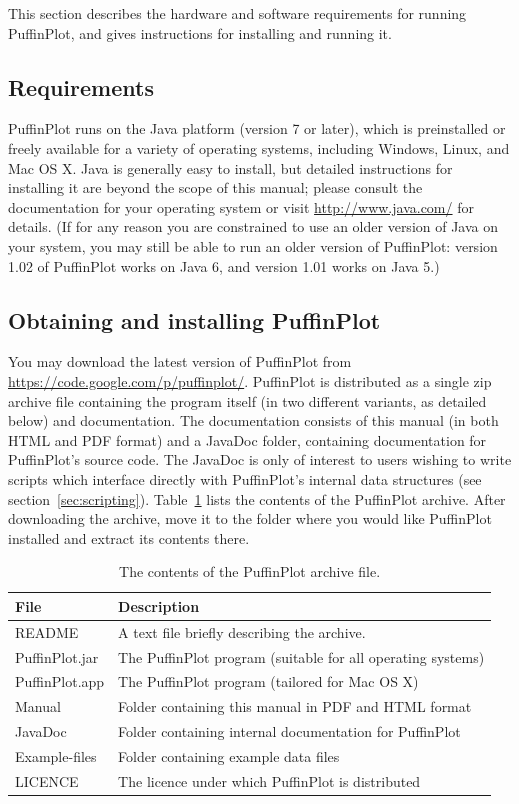 \documentclass[a4paper,british]{article}
\begin{document}
This section describes the hardware and software requirements for
running PuffinPlot, and gives instructions for installing and running
it.

\subsection{Requirements}

PuffinPlot runs on the Java platform (version 7 or later), which is
preinstalled or freely available for a variety of operating systems,
including Windows, Linux, and Mac OS X. Java is generally easy to install,
but detailed instructions for installing it are beyond the scope of this
manual; please consult the documentation for your operating system or visit
\url{http://www.java.com/} for details. (If for any reason you are
constrained to use an older version of Java on your system, you may still
be able to run an older version of PuffinPlot: version 1.02 of PuffinPlot
works on Java 6, and version 1.01 works on Java 5.)

\subsection{Obtaining and installing PuffinPlot}

You may download the latest version of PuffinPlot from
\url{https://code.google.com/p/puffinplot/}. PuffinPlot is distributed as a
single zip archive file containing the program itself (in two different
variants, as detailed below) and documentation. The documentation consists of
this manual (in both HTML and PDF format) and a JavaDoc folder, containing
documentation for PuffinPlot's source code. The JavaDoc is only of interest
to users wishing to write scripts which interface directly with PuffinPlot's
internal data structures (see section~\ref{sec:scripting}).
Table~\ref{tbl:archive-contents} lists the contents of the PuffinPlot
archive. After downloading the archive, move it to the folder where you
would like PuffinPlot installed and extract its contents there.

\begin{table}[bp]
  \caption{\label{tbl:archive-contents} The contents of the PuffinPlot archive file.}
\begin{tabular}{ll} \toprule
File           & Description \\ \midrule
README         & A text file briefly describing the archive. \\
PuffinPlot.jar & The PuffinPlot program (suitable for all operating systems) \\
PuffinPlot.app & The PuffinPlot program (tailored for Mac OS X) \\
Manual         & Folder containing this manual in PDF and HTML format \\
JavaDoc        & Folder containing internal documentation for PuffinPlot \\
Example-files  & Folder containing example data files \\
LICENCE        & The licence under which PuffinPlot is distributed \\
\bottomrule
\end{tabular}
\end{table}
\end{document}
